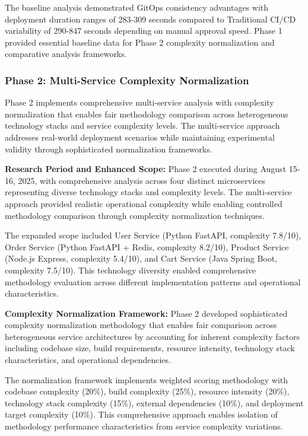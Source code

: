 The baseline analysis demonstrated GitOps consistency advantages with deployment duration ranges of 283-309 seconds compared to Traditional CI/CD variability of 290-847 seconds depending on manual approval speed. Phase 1 provided essential baseline data for Phase 2 complexity normalization and comparative analysis frameworks.

\subsubsection{Phase 2: Multi-Service Complexity Normalization}

Phase 2 implements comprehensive multi-service analysis with complexity normalization that enables fair methodology comparison across heterogeneous technology stacks and service complexity levels. The multi-service approach addresses real-world deployment scenarios while maintaining experimental validity through sophisticated normalization frameworks.

\textbf{Research Period and Enhanced Scope:}
Phase 2 executed during August 15-16, 2025, with comprehensive analysis across four distinct microservices representing diverse technology stacks and complexity levels. The multi-service approach provided realistic operational complexity while enabling controlled methodology comparison through complexity normalization techniques.

The expanded scope included User Service (Python FastAPI, complexity 7.8/10), Order Service (Python FastAPI + Redis, complexity 8.2/10), Product Service (Node.js Express, complexity 5.4/10), and Cart Service (Java Spring Boot, complexity 7.5/10). This technology diversity enabled comprehensive methodology evaluation across different implementation patterns and operational characteristics.

\textbf{Complexity Normalization Framework:}
Phase 2 developed sophisticated complexity normalization methodology that enables fair comparison across heterogeneous service architectures by accounting for inherent complexity factors including codebase size, build requirements, resource intensity, technology stack characteristics, and operational dependencies.

The normalization framework implements weighted scoring methodology with codebase complexity (20\%), build complexity (25\%), resource intensity (20\%), technology stack complexity (15\%), external dependencies (10\%), and deployment target complexity (10\%). This comprehensive approach enables isolation of methodology performance characteristics from service complexity variations.

